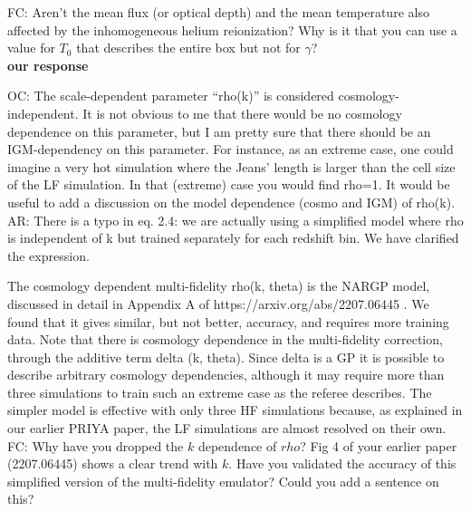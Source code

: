 \documentclass[12pt]{article}
\begin{document}
FC: Aren’t the mean flux (or optical depth) and the mean temperature also affected by the inhomogeneous helium reionization? Why is it that you can use a value for $T_0$ that describes the entire box but not for $\gamma$?\\

\textbf{our response}\\

\hrulefill \newline

OC: The scale-dependent parameter “rho(k)” is considered cosmology-independent. It is not obvious to me that there would be no cosmology dependence on this parameter, but I am pretty sure that there should be an IGM-dependency on this parameter. For instance, as an extreme case, one could imagine a very hot simulation where the Jeans’ length is larger than the cell size of the LF simulation. In that (extreme) case you would find rho=1. It would be useful to add a discussion on the model dependence (cosmo and IGM) of rho(k).\\

AR: There is a typo in eq. 2.4: we are actually using a simplified model where rho is independent of k but trained separately for each redshift bin. We have clarified the expression.

The cosmology dependent multi-fidelity rho(k, theta) is the NARGP model, discussed in detail in Appendix A of https://arxiv.org/abs/2207.06445 . We found that it gives similar, but not better, accuracy, and requires more training data. Note that there is cosmology dependence in the multi-fidelity correction, through the additive term delta (k, theta). Since delta is a GP it is possible to describe arbitrary cosmology dependencies, although it may require more than three simulations to train such an extreme case as the referee describes. The simpler model is effective with only three HF simulations because, as explained in our earlier PRIYA paper, the LF simulations are almost resolved on their own.\\

FC: Why have you dropped the $k$ dependence of $rho$? Fig 4 of your earlier paper (2207.06445) shows a clear trend with $k$. Have you validated the accuracy of this simplified version of the multi-fidelity emulator? Could you add a sentence on this?\\
\end{document}
